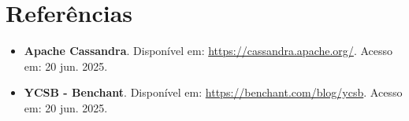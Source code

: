 \section{Referências}
\begin{itemize}
	\item \textbf{Apache Cassandra}. Disponível em: \url{https://cassandra.apache.org/}. Acesso em: 20 jun. 2025.
	\item \textbf{YCSB - Benchant}. Disponível em: \url{https://benchant.com/blog/ycsb}. Acesso em: 20 jun. 2025.
\end{itemize}